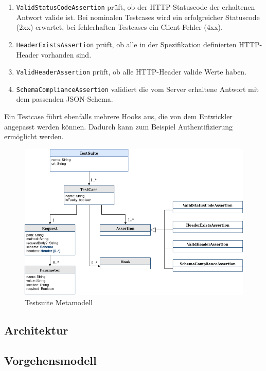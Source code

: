 \begin{enumerate}
	\item \lstinline|ValidStatusCodeAssertion| prüft, ob der HTTP-Statuscode der erhaltenen Antwort valide ist. Bei nominalen Testcases wird ein erfolgreicher Statuscode (2xx) erwartet, bei fehlerhaften Testcases ein Client-Fehler (4xx).
	\item \lstinline|HeaderExistsAssertion| prüft, ob alle in der Spezifikation definierten HTTP-Header vorhanden sind.
	\item \lstinline|ValidHeaderAssertion| prüft, ob alle HTTP-Header valide Werte haben.
	\item \lstinline|SchemaComplianceAssertion| validiert die vom Server erhaltene Antwort mit dem passenden JSON-Schema.
\end{enumerate}

Ein Testcase führt ebenfalls mehrere Hooks aus, die von dem Entwickler angepasst werden können. Dadurch kann zum Beispiel Authentifizierung ermöglicht werden.

\begin{figure}
\centering
  \includegraphics[width=\textwidth]{../images/testsuite.png}
  \caption{Testsuite Metamodell}
  \label{fig:testsuite}
\end{figure}




\subsection{Architektur}


\subsection{Vorgehensmodell}
